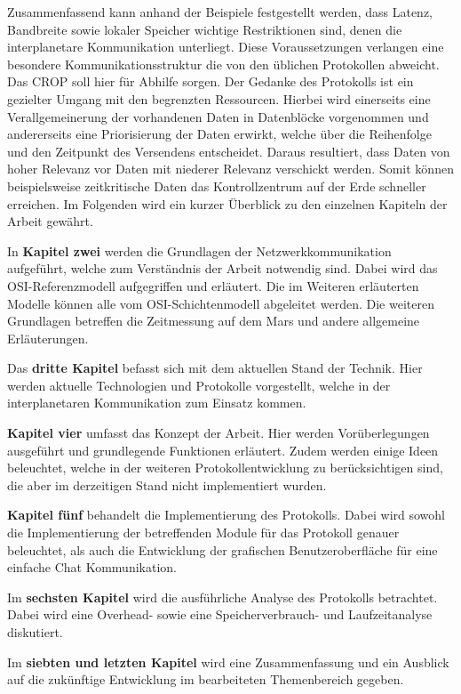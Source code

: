 Zusammenfassend kann anhand der Beispiele festgestellt werden, dass Latenz, 
Bandbreite sowie lokaler Speicher wichtige Restriktionen sind, denen die 
interplanetare Kommunikation unterliegt. Diese Voraussetzungen verlangen 
eine besondere Kommunikationsstruktur die von den {\"u}blichen Protokollen 
abweicht. Das \gls{CROP} soll hier f{\"u}r Abhilfe sorgen.
Der Gedanke des Protokolls ist ein gezielter Umgang mit den begrenzten 
Ressourcen. Hierbei wird einerseits eine Verallgemeinerung der vorhandenen 
Daten in Datenbl{\"o}cke vorgenommen und andererseits eine Priorisierung der 
Daten erwirkt, welche {\"u}ber die Reihenfolge und den Zeitpunkt des 
Versendens entscheidet. Daraus resultiert, dass Daten von hoher Relevanz 
vor Daten mit niederer Relevanz verschickt werden. Somit k{\"o}nnen 
beispielsweise zeitkritische Daten das Kontrollzentrum auf der Erde 
schneller erreichen. Im Folgenden wird ein kurzer {\"U}berblick zu den einzelnen
Kapiteln der Arbeit gew{\"a}hrt.

In \textbf{Kapitel zwei} werden die Grundlagen der Netzwerkkommunikation
aufgef{\"u}hrt, welche zum Verst{\"a}ndnis der Arbeit notwendig sind. Dabei wird
\zB das OSI-Referenzmodell aufgegriffen und erl{\"a}utert. Die im Weiteren
erl{\"a}uterten Modelle k{\"o}nnen alle vom OSI-Schichtenmodell abgeleitet
werden. Die weiteren Grundlagen betreffen die Zeitmessung auf dem Mars und
andere allgemeine Erl{\"a}uterungen.

Das \textbf{dritte Kapitel} befasst sich mit dem aktuellen Stand der Technik.
Hier werden aktuelle Technologien und Protokolle vorgestellt, welche in der
interplanetaren Kommunikation zum Einsatz kommen.

\textbf{Kapitel vier} umfasst das Konzept der Arbeit. Hier werden
Vor{\"u}berlegungen ausgef{\"u}hrt und grundlegende Funktionen erl{\"a}utert.
Zudem werden einige Ideen beleuchtet, welche in der weiteren
Protokollentwicklung zu ber{\"u}cksichtigen sind, die aber im derzeitigen Stand
nicht implementiert wurden.

\textbf{Kapitel f{\"u}nf} behandelt die Implementierung des Protokolls. Dabei
wird sowohl die Implementierung der betreffenden Module für das Protokoll
genauer beleuchtet, als auch die Entwicklung der grafischen Benutzeroberfläche
f{\"u}r eine einfache Chat Kommunikation.

Im \textbf{sechsten Kapitel} wird die ausf{\"u}hrliche Analyse des Protokolls
betrachtet.
Dabei wird eine Overhead- sowie eine Speicherverbrauch- und
Laufzeitanalyse diskutiert.

Im \textbf{siebten und letzten Kapitel} wird eine Zusammenfassung und ein
Ausblick auf die zuk{\"u}nftige Entwicklung im bearbeiteten Themenbereich gegeben.

